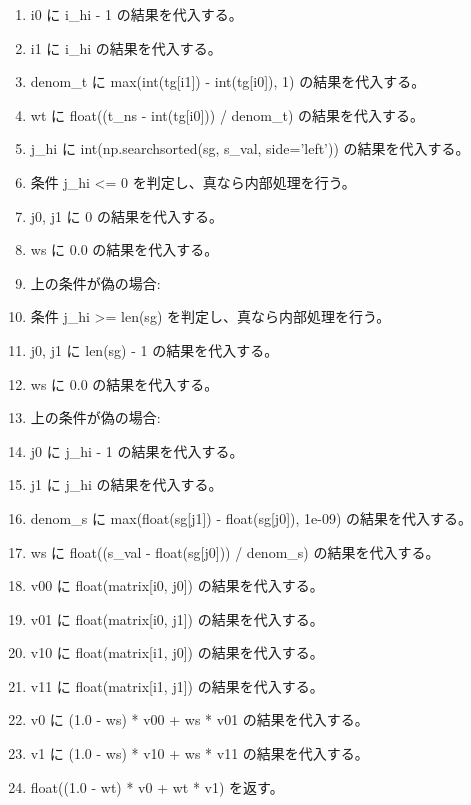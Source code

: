 \documentclass[a4paper,11pt]{article}
\begin{document}
\begin{enumerate}[leftmargin=1.8em]
\item     i0 に i\_hi - 1 の結果を代入する。
\item     i1 に i\_hi の結果を代入する。
\item     denom\_t に max(int(tg[i1]) - int(tg[i0]), 1) の結果を代入する。
\item     wt に float((t\_ns - int(tg[i0])) / denom\_t) の結果を代入する。
\item j\_hi に int(np.searchsorted(sg, s\_val, side='left')) の結果を代入する。
\item 条件 j\_hi <= 0 を判定し、真なら内部処理を行う。
\item   j0, j1 に 0 の結果を代入する。
\item   ws に 0.0 の結果を代入する。
\item   上の条件が偽の場合:
\item   条件 j\_hi >= len(sg) を判定し、真なら内部処理を行う。
\item     j0, j1 に len(sg) - 1 の結果を代入する。
\item     ws に 0.0 の結果を代入する。
\item     上の条件が偽の場合:
\item     j0 に j\_hi - 1 の結果を代入する。
\item     j1 に j\_hi の結果を代入する。
\item     denom\_s に max(float(sg[j1]) - float(sg[j0]), 1e-09) の結果を代入する。
\item     ws に float((s\_val - float(sg[j0])) / denom\_s) の結果を代入する。
\item v00 に float(matrix[i0, j0]) の結果を代入する。
\item v01 に float(matrix[i0, j1]) の結果を代入する。
\item v10 に float(matrix[i1, j0]) の結果を代入する。
\item v11 に float(matrix[i1, j1]) の結果を代入する。
\item v0 に (1.0 - ws) * v00 + ws * v01 の結果を代入する。
\item v1 に (1.0 - ws) * v10 + ws * v11 の結果を代入する。
\item float((1.0 - wt) * v0 + wt * v1) を返す。
            \end{enumerate}
\end{document}
